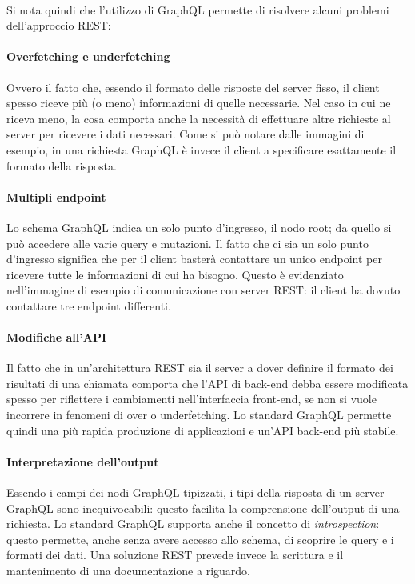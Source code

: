 \documentclass[a4paper, 12pt]{report}
\begin{document}
        \paragraph*{}Si nota quindi che l'utilizzo di GraphQL permette di risolvere alcuni problemi dell'approccio REST:
        \paragraph*{Overfetching e underfetching} 
          Ovvero il fatto che, essendo il formato delle risposte del server fisso, il client spesso riceve più (o meno) informazioni di quelle necessarie.
          Nel caso in cui ne riceva meno, la cosa comporta anche la necessità di effettuare altre richieste al server per ricevere i dati necessari.
          Come si può notare dalle immagini di esempio, in una richiesta GraphQL è invece il client a specificare esattamente il formato della risposta.
        \paragraph*{Multipli endpoint}
          Lo schema GraphQL indica un solo punto d'ingresso, il nodo root; da quello si può accedere alle varie query e mutazioni.
          Il fatto che ci sia un solo punto d'ingresso significa che per il client basterà contattare un unico endpoint per ricevere tutte le informazioni di cui ha bisogno.
          Questo è evidenziato nell'immagine di esempio di comunicazione con server REST: il client ha dovuto contattare tre endpoint differenti.
        \paragraph*{Modifiche all'API}
          Il fatto che in un'architettura REST sia il server a dover definire il formato dei risultati di una chiamata comporta che l'API di back-end debba essere modificata spesso per riflettere i cambiamenti nell'interfaccia front-end, se non si vuole
          incorrere in fenomeni di over o underfetching.
          Lo standard GraphQL permette quindi una più rapida produzione di applicazioni e un'API back-end più stabile.
        \paragraph*{Interpretazione dell'output}
          Essendo i campi dei nodi GraphQL tipizzati, i tipi della risposta di un server GraphQL sono inequivocabili: questo facilita la comprensione dell'output di una richiesta.
          Lo standard GraphQL supporta anche il concetto di \emph{introspection}: questo permette, anche senza avere accesso allo schema, di scoprire le query e i formati dei dati.
          Una soluzione REST prevede invece la scrittura e il mantenimento di una documentazione a riguardo.
\end{document}
